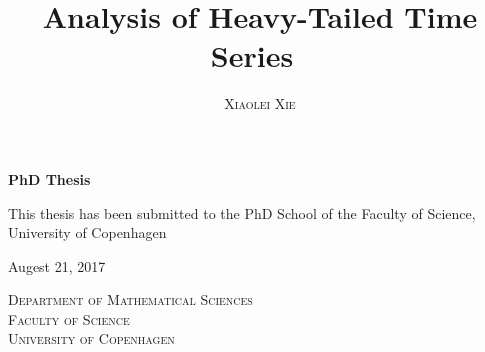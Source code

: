 

\title{\textbf{\HUGE Analysis of Heavy-Tailed Time Series\ \\ \vspace{1.5em}}}	
\author{\Huge \textsc{Xiaolei Xie}}
\date{}
\maketitle
\thispagestyle{empty}
\begin{center}
\LARGE
\Huge\textbf{PhD Thesis}

\vspace{7em}
\LARGE
This thesis has been submitted to the PhD School of the Faculty of Science, University of Copenhagen

\vspace{2em}

Augest 21, 2017

\vspace{2em}

\textsc{Department of Mathematical Sciences \\ Faculty of Science \\ University of Copenhagen}
\end{center}
